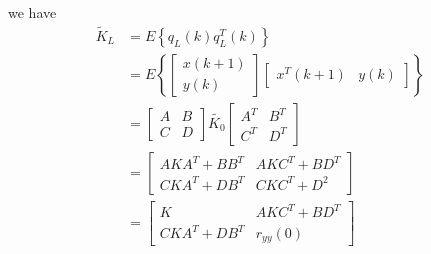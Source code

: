 \documentclass[a4paper,twoside,10pt,english]{report}
\begin{document}
we have
\begin{align*}
\tilde{K}_{L} &= E\left\{q_{L}\left(k\right)q_{L}^{T}\left(k\right)\right\}\\
 &= E\left\{ \left[\begin{array}{c}
x\left(k+1\right)\\
y\left(k\right)
\end{array}\right]\left[\begin{array}{cc}
x^{T}\left(k+1\right) & y\left(k\right)\end{array}\right]\right\} \\
 &= \left[\begin{array}{cc}
A & B\\
C & D
\end{array}\right]\tilde{K_{0}}\left[\begin{array}{cc}
A^{T} & B^{T}\\
C^{T} & D^{T}
\end{array}\right]\\
 &= \left[\begin{array}{cc}
AKA^{T}+BB^{T} & AKC^{T}+BD^{T}\\
CKA^{T}+DB^{T} & CKC^{T}+D^{2}
\end{array}\right]\\
 &= \left[\begin{array}{cc}
K & AKC^{T}+BD^{T}\\
CKA^{T}+DB^{T} & r_{yy}\left(0\right)
\end{array}\right]
\end{align*}
\end{document}
